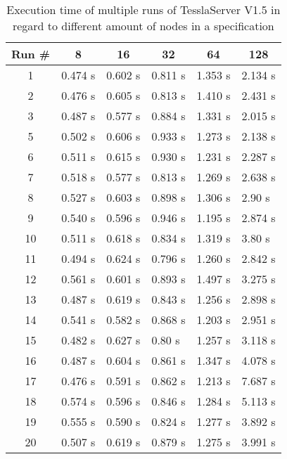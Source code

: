 \begin{table}[!htb]
  \centering
  \caption{Execution time of multiple runs of TesslaServer V1.5 in regard to different amount of nodes in a specification}
  \label{table:tessla_server_v1_5_num_nodes}
  \begin{tabular}{clllll}
    Run \# & \multicolumn{1}{c}{8} & \multicolumn{1}{c}{16} & \multicolumn{1}{c}{32} & \multicolumn{1}{c}{64} & \multicolumn{1}{c}{128}\\ \hline
    1 & 0.474 s & 0.602 s & 0.811 s & 1.353 s & 2.134 s \\
    2 & 0.476 s & 0.605 s & 0.813 s & 1.410 s & 2.431 s \\
    3 & 0.487 s & 0.577 s & 0.884 s & 1.331 s & 2.015 s \\
    5 & 0.502 s & 0.606 s & 0.933 s & 1.273 s & 2.138 s \\
    6 & 0.511 s & 0.615 s & 0.930 s & 1.231 s & 2.287 s \\
    7 & 0.518 s & 0.577 s & 0.813 s & 1.269 s & 2.638 s \\
    8 & 0.527 s & 0.603 s & 0.898 s & 1.306 s & 2.90 s  \\
    9 & 0.540 s & 0.596 s & 0.946 s & 1.195 s & 2.874 s \\
    10 &0.511 s & 0.618 s & 0.834 s & 1.319 s & 3.80 s  \\
    11 &0.494 s & 0.624 s & 0.796 s & 1.260 s & 2.842 s \\
    12 &0.561 s & 0.601 s & 0.893 s & 1.497 s & 3.275 s \\
    13 &0.487 s & 0.619 s & 0.843 s & 1.256 s & 2.898 s \\
    14 &0.541 s & 0.582 s & 0.868 s & 1.203 s & 2.951 s \\
    15 &0.482 s & 0.627 s & 0.80 s  & 1.257 s & 3.118 s \\
    16 &0.487 s & 0.604 s & 0.861 s & 1.347 s & 4.078 s \\
    17 &0.476 s & 0.591 s & 0.862 s & 1.213 s & 7.687 s \\
    18 &0.574 s & 0.596 s & 0.846 s & 1.284 s & 5.113 s \\
    19 &0.555 s & 0.590 s & 0.824 s & 1.277 s & 3.892 s \\
    20 &0.507 s & 0.619 s & 0.879 s & 1.275 s & 3.991 s
  \end{tabular}
\end{table}

